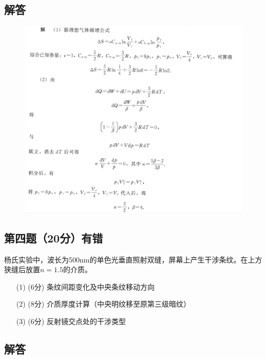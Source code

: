 \documentclass{article}
\begin{document}
\subsection*{解答}
\begin{figure}[H]
    \centering
    \includegraphics[width=1.3\linewidth]{Screenshot_20250416_225431.jpg}
\end{figure}

\subsection*{第四题（20分）有错}
杨氏实验中，波长为500nm的单色光垂直照射双缝，屏幕上产生干涉条纹。在上方狭缝后放置$n=1.5$的介质。

\begin{enumerate}
  \item[(1)] (6分) 条纹间距变化及中央条纹移动方向
  \item[(2)] (8分) 介质厚度计算（中央明纹移至原第三级暗纹）
  \item[(3)] (6分) 反射镜交点处的干涉类型
\end{enumerate}

\subsection*{解答}
\end{document}
